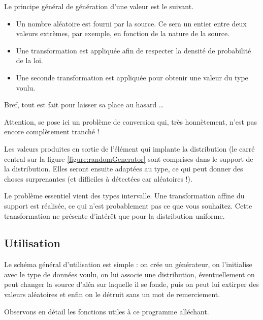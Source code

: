    Le principe général de génération d'une valeur est le suivant.

\begin{itemize}
   \item Un nombre aléatoire est fourni par la source. Ce sera un
     entier entre deux valeurs extrèmes, par exemple, en fonction de
     la nature de la source.
   \item Une transformation est appliquée afin de respecter la
     densité de probabilité de la loi.
   \item Une seconde transformation est appliquée pour obtenir une
     valeur du type voulu.
\end{itemize}

   Bref, tout est fait pour laisser sa place au hasard \ldots

   Attention, se pose ici un problème de conversion qui, très
honnètement, n'est pas encore complètement tranché !

   Les valeurs produites en sortie de l'élément qui implante la
distribution (le carré central sur la figure
\ref{figure:randomGenerator} sont comprises dans le support de la
distribution. Elles seront ensuite adaptées au type, ce qui peut
donner des choses surprenantes (et difficiles à détectées car
aléatoires !).

   Le problème essentiel vient des types intervalle. Une
transformation affine du support est réalisée, ce qui n'est
probablement pas ce que vous souhaitez. Cette transformation ne
présente d'intérêt que pour la distribution uniforme.

%
\subsection{Utilisation}

   Le schéma général d'utilisation est simple : on crée un générateur,
on l'initialise avec le type de données voulu, on lui associe une
distribution, éventuellement on peut changer la source d'aléa sur
laquelle il se fonde, puis on peut lui extirper des valeurs aléatoires
et enfin on le détruit sans un mot de remerciement.

   Observons en détail les fonctions utiles à ce programme alléchant.

%
